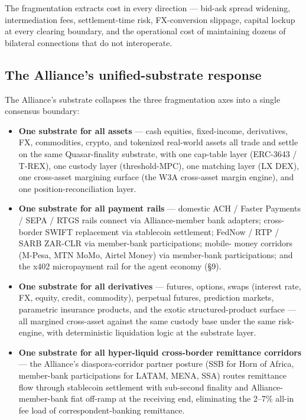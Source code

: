 The fragmentation extracts cost in every direction --- bid-ask spread
widening, intermediation fees, settlement-time risk, FX-conversion
slippage, capital lockup at every clearing boundary, and the
operational cost of maintaining dozens of bilateral connections that
do not interoperate.

\subsection{The Alliance's unified-substrate response}

The Alliance's substrate collapses the three fragmentation axes into a
single consensus boundary:

\begin{itemize}[leftmargin=2em,itemsep=0.1em]
\item \textbf{One substrate for all assets} --- cash equities,
fixed-income, derivatives, FX, commodities, crypto, and tokenized
real-world assets all trade and settle on the same Quasar-finality
substrate, with one cap-table layer (ERC-3643 / T-REX), one custody
layer (threshold-MPC), one matching layer (LX DEX), one cross-asset
margining surface (the W3A cross-asset margin engine), and one
position-reconciliation layer.
\item \textbf{One substrate for all payment rails} --- domestic ACH /
Faster Payments / SEPA / RTGS rails connect via Alliance-member bank
adapters; cross-border SWIFT replacement via stablecoin settlement;
FedNow / RTP / SARB ZAR-CLR via member-bank participations; mobile-
money corridors (M-Pesa, MTN MoMo, Airtel Money) via member-bank
participations; and the x402 micropayment rail for the agent economy
(\S 9).
\item \textbf{One substrate for all derivatives} --- futures, options,
swaps (interest rate, FX, equity, credit, commodity), perpetual
futures, prediction markets, parametric insurance products, and the
exotic structured-product surface --- all margined cross-asset against
the same custody base under the same risk-engine, with deterministic
liquidation logic at the substrate layer.
\item \textbf{One substrate for all hyper-liquid cross-border
remittance corridors} --- the Alliance's diaspora-corridor partner
posture (SSB for Horn of Africa, member-bank participations for
LATAM, MENA, SSA) routes remittance flow through stablecoin
settlement with sub-second finality and Alliance-member-bank fiat
off-ramp at the receiving end, eliminating the 2--7\% all-in fee
load of correspondent-banking remittance.
\end{itemize}

